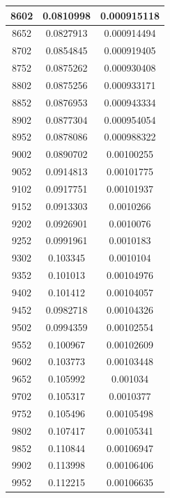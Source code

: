\documentclass{article}
\begin{document}
\begin{longtable}{|c|c|c|}
		8602	&  0.0810998  	 &  0.000915118  \\ \hline                  
		8652	&  0.0827913  	 &  0.000914494  \\ \hline                  
		8702	&  0.0854845  	 &  0.000919405  \\ \hline                  
		8752	&  0.0875262  	 &  0.000930408  \\ \hline                  
		8802	&  0.0875256  	 &  0.000933171  \\ \hline                  
		8852	&  0.0876953  	 &  0.000943334  \\ \hline                  
		8902	&  0.0877304  	 &  0.000954054  \\ \hline                  
		8952	&  0.0878086  	 &  0.000988322  \\ \hline                  
		9002	&  0.0890702  	 &  0.00100255   \\ \hline                 
		9052	&  0.0914813  	 &  0.00101775   \\ \hline                 
		9102	&  0.0917751  	 &  0.00101937   \\ \hline                 
		9152	&  0.0913303  	 &  0.0010266    \\ \hline                
		9202	&  0.0926901  	 &  0.0010076    \\ \hline                
		9252	&  0.0991961  	 &  0.0010183    \\ \hline                
		9302	&  0.103345   	 &  0.0010104    \\ \hline                
		9352	&  0.101013   	 &  0.00104976   \\ \hline                 
		9402	&  0.101412   	 &  0.00104057   \\ \hline                 
		9452	&  0.0982718  	 &  0.00104326   \\ \hline                 
		9502	&  0.0994359  	 &  0.00102554   \\ \hline                 
		9552	&  0.100967   	 &  0.00102609   \\ \hline                 
		9602	&  0.103773   	 &  0.00103448   \\ \hline                 
		9652	&  0.105992   	 &  0.001034     \\ \hline               
		9702	&  0.105317   	 &  0.0010377    \\ \hline                
		9752	&  0.105496   	 &  0.00105498   \\ \hline                 
		9802	&  0.107417   	 &  0.00105341   \\ \hline                 
		9852	&  0.110844   	 &  0.00106947   \\ \hline                 
		9902	&  0.113998   	 &  0.00106406   \\ \hline                 
		9952	&  0.112215   	 &  0.00106635   \\ \hline     
	\end{longtable}
	
\end{document}
